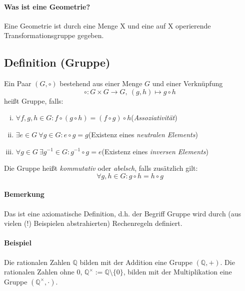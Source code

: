 \paragraph{Was ist eine Geometrie?}
	Eine Geometrie ist durch eine Menge X und eine auf X operierende Transformationsgruppe gegeben.

\subsection{Definition (Gruppe)}
	\begin{Definition}[Gruppe]
		Ein Paar $(G,\circ)$ bestehend aus einer Menge $G$ und einer Verknüpfung 
		\[\circ : G\times G \to G,\ (g,h) \mapsto g \circ h\]
		heißt Gruppe, falls:
                \begin{enumerate}[(i)]
                        \item $\forall f,g,h \in G : f\circ (g\circ h) = (f\circ g)\circ h$\hfill (\emph{Assoziativität})
                        \item $\exists e\in G\ \forall g\in G : e\circ g = g$\hfill (Existenz eines \emph{neutralen Elements})
                        \item $\forall g \in G\ \exists g^{-1} \in G : g^{-1}\circ g = e$\hfill (Existenz eines \emph{inversen Elements})
                \end{enumerate}
                Die Gruppe heißt \emph{kommutativ} oder \emph{abelsch}, falls zusätzlich gilt:
                        \[\forall g,h\in G: g\circ h = h\circ g\] %
	\end{Definition}

\paragraph{Bemerkung}
	Das ist eine axiomatische Definition, d.h. der Begriff \glqq Gruppe\grqq{} wird durch (aus vielen (!) Beispielen abstrahierten) \glqq Rechenregeln\grqq{} definiert.
\paragraph{Beispiel}
	Die rationalen Zahlen $\mathbb{Q}$ bilden mit der Addition eine Gruppe $(\mathbb{Q} ,+)$.
	Die rationalen Zahlen ohne $0$, $\mathbb{Q}^{\times} := \mathbb{Q}\setminus \{0\}$, bilden mit der Multiplikation eine Gruppe $(\mathbb{Q}^\times ,\cdot)$.

